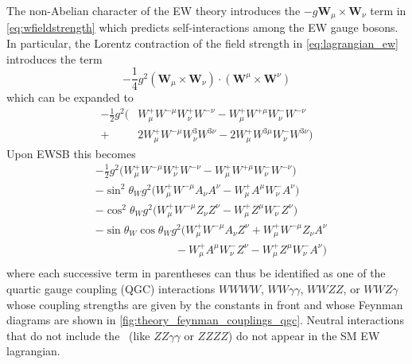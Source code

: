 The non-Abelian character of the 
EW theory introduces the $-g\textbf{W}_{\mu} \times \textbf{W}_{\nu}$
term in \eqref{eq:wfieldstrength}
which predicts self-interactions
among the EW gauge bosons. 
In particular, the Lorentz contraction of the field strength 
in \eqn\eqref{eq:lagrangian_ew}
introduces the term 
\begin{equation}
-\frac{1}{4} g^2 (\textbf{W}_{\mu} \times \textbf{W}_{\nu}) \cdot
                 (\textbf{W}^{\mu} \times \textbf{W}^{\nu}) 
\end{equation}
which can be expanded to 
\begin{equation}
\begin{aligned}
-\frac{1}{2} g^2 \Big( & W_{\mu}^+ W^{-\mu} W_{\nu}^+W^{-\nu}
                  -  W_{\mu}^+ W^{+\mu} W_{\nu}^- W^{-\nu} \\
		  + &2 W_{\mu}^+ W^{-\mu} W^{3}_{\nu}W^{3 \nu}
		  - 2 W_{\mu}^+ W^{3\mu} W_{\nu}^- W^{3 \nu}\Big)
\end{aligned}
\end{equation}
Upon EWSB this becomes
\begin{equation}
\begin{aligned}
&-\frac{1}{2} g^2 \Big(  W_{\mu}^+ W^{-\mu} W_{\nu}^+W^{-\nu}
                  -  W_{\mu}^+ W^{+\mu} W_{\nu}^- W^{-\nu} \Big) \\
&-\sin^2\theta_W g^2 \Big(  W_{\mu}^+ W^{-\mu} A_{\nu} A^{\nu}
                  -  W_{\mu}^+ A^{\mu} W_{\nu}^- A^{\nu} \Big)\\
&-\cos^2\theta_W g^2 \Big( W_{\mu}^+ W^{-\mu} Z_{\nu} Z^{\nu}
                  -  W_{\mu}^+ Z^{\mu} W_{\nu}^- Z^{\nu} \Big)\\
&-\sin\theta_W\cos\theta_W g^2 \Big( W_{\mu}^+ W^{-\mu} A_{\nu} Z^{\nu}
                  +W_{\mu}^+W^{-\mu} Z_{\nu} A^{\nu}\\
		  &\hspace{3cm}- W_{\mu}^+ A^{\mu} W_{\nu}^- Z^{\nu}
		  - W_{\mu}^+ Z^{\mu} W_{\nu}^- A^{\nu}\Big)\\
\end{aligned}
\label{eq:lagrangian_qgc}
\end{equation}
where each successive term in parentheses  
can thus be identified as one of the quartic gauge coupling
(QGC) interactions $WWWW$, $WW\gamma\gamma$, $WWZZ$, or $WWZ\gamma$
whose coupling strengths are given by the constants in front and
whose Feynman diagrams 
are shown in \fig\ref{fig:theory_feynman_couplings_qgc}.
Neutral interactions that do not 
include the \dubya~(like $ZZ\gamma\gamma$ or $ZZZZ$)
do not appear in the SM EW lagrangian.





